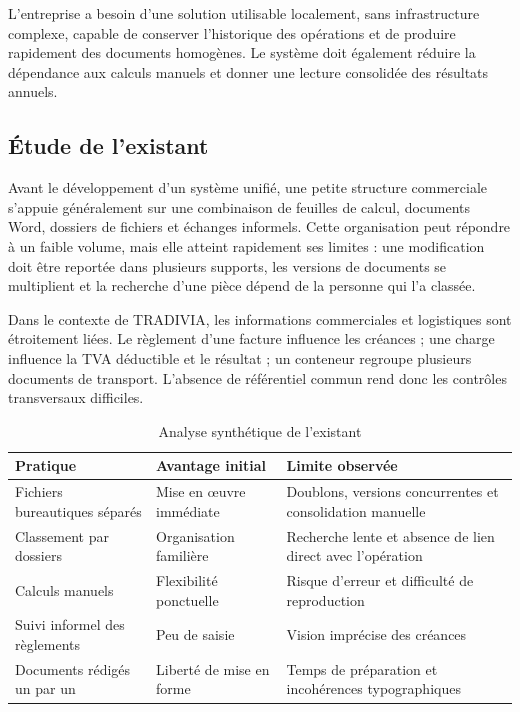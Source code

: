 \documentclass[12pt,a4paper,oneside]{report}
\begin{document}
L'entreprise a besoin d'une solution utilisable localement, sans infrastructure complexe, capable de conserver l'historique des opérations et de produire rapidement des documents homogènes. Le système doit également réduire la dépendance aux calculs manuels et donner une lecture consolidée des résultats annuels.

\subsection{Étude de l'existant}
Avant le développement d'un système unifié, une petite structure commerciale s'appuie généralement sur une combinaison de feuilles de calcul, documents Word, dossiers de fichiers et échanges informels. Cette organisation peut répondre à un faible volume, mais elle atteint rapidement ses limites : une modification doit être reportée dans plusieurs supports, les versions de documents se multiplient et la recherche d'une pièce dépend de la personne qui l'a classée.

Dans le contexte de TRADIVIA, les informations commerciales et logistiques sont étroitement liées. Le règlement d'une facture influence les créances ; une charge influence la TVA déductible et le résultat ; un conteneur regroupe plusieurs documents de transport. L'absence de référentiel commun rend donc les contrôles transversaux difficiles.

\begin{table}[H]\centering
\caption{Analyse synthétique de l'existant}
\begin{tabularx}{\textwidth}{Y Y Y}
\toprule \textbf{Pratique} & \textbf{Avantage initial} & \textbf{Limite observée}\\ \midrule
Fichiers bureautiques séparés & Mise en œuvre immédiate & Doublons, versions concurrentes et consolidation manuelle\\
Classement par dossiers & Organisation familière & Recherche lente et absence de lien direct avec l'opération\\
Calculs manuels & Flexibilité ponctuelle & Risque d'erreur et difficulté de reproduction\\
Suivi informel des règlements & Peu de saisie & Vision imprécise des créances\\
Documents rédigés un par un & Liberté de mise en forme & Temps de préparation et incohérences typographiques\\
\bottomrule
\end{tabularx}
\end{table}
\end{document}

